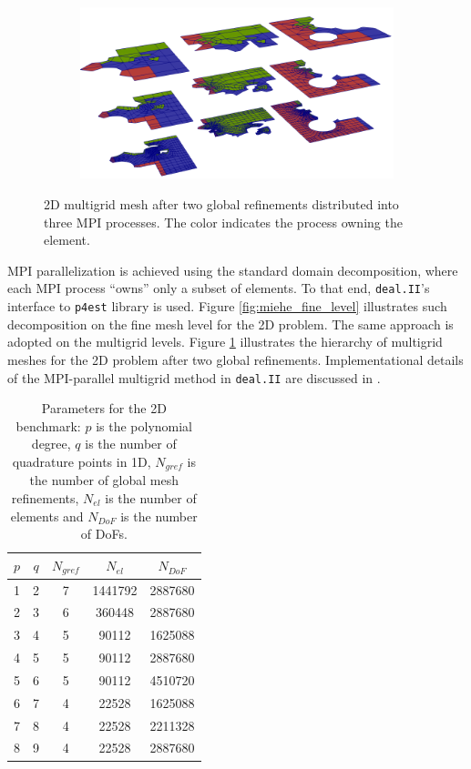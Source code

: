 \documentclass[times,doublespace]{nmeauth}
\begin{document}
\begin{figure}[!ht]
  \centering
  \begin{subfigure}[b]{0.8\textwidth}
    \centering
    \includegraphics[width=\textwidth]{gmg_2d.png}
  \end{subfigure}
  \caption{2D multigrid mesh after two global refinements distributed into three MPI processes. The color indicates the process owning the element.}%
  \label{fig:miehe_gmg}
\end{figure}
%
%
{\color{red}
MPI parallelization is achieved using the standard domain decomposition, where each MPI process ``owns'' only a subset of elements.
To that end, \texttt{deal.II}'s interface to \texttt{p4est} \cite{p4est} library is used.
Figure \ref{fig:miehe_fine_level} illustrates such decomposition on the fine mesh level for the 2D problem.
The same approach is adopted on the multigrid levels.}
Figure \ref{fig:miehe_gmg} illustrates the hierarchy of multigrid meshes for the 2D problem after two global refinements.
{\color{red}
Implementational details of the MPI-parallel multigrid method in \texttt{deal.II} are discussed in \cite{Clevenger2018}.
}

\begin{table}
  \centering
  \begin{tabular}{ccccc}
  \hline
    $p$ & $q$ & $N_{gref}$ & $N_{el}$ & $N_{DoF}$ \\
  \hline
    1 & 2 & 7 & 1441792 & 2887680 \\
    2 & 3 & 6 & 360448 & 2887680 \\
    3 & 4 & 5 & 90112 & 1625088 \\
    4 & 5 & 5 & 90112 & 2887680 \\
    5 & 6 & 5 & 90112 & 4510720 \\
    6 & 7 & 4 & 22528 & 1625088 \\
    7 & 8 & 4 & 22528 & 2211328 \\
    8 & 9 & 4 & 22528 & 2887680 \\
  \hline
  \end{tabular}
  \caption{Parameters for the 2D benchmark: $p$ is the polynomial degree,
  $q$ is the number of quadrature points in 1D, $N_{gref}$ is the number of global mesh refinements, $N_{el}$ is the number of elements and $N_{DoF}$ is the number of DoFs.
  }
  \label{tab:input_parameters_2d}
\end{table}
\end{document}
